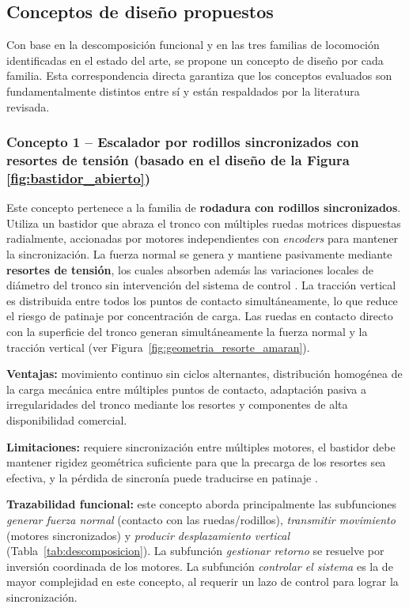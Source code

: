 \documentclass[lettersize,journal]{IEEEtran}
\begin{document}
\subsection{\textbf{Conceptos de diseño propuestos}}

Con base en la descomposición funcional y en las tres familias de locomoción
identificadas en el estado del arte, se propone un concepto de diseño por cada
familia. Esta correspondencia directa garantiza que los conceptos evaluados son
fundamentalmente distintos entre sí y están respaldados por la literatura revisada.

\subsubsection{Concepto 1 -- Escalador por rodillos sincronizados con resortes de
tensión (basado en el diseño de la Figura \ref{fig:bastidor_abierto})}

Este concepto pertenece a la familia de \textbf{rodadura con rodillos sincronizados}.
Utiliza un bastidor que abraza el tronco con múltiples ruedas motrices dispuestas
radialmente, accionadas por motores independientes con \emph{encoders} para mantener
la sincronización. La fuerza normal se genera y mantiene pasivamente mediante
\textbf{resortes de tensión}, los cuales absorben además las variaciones locales de
diámetro del tronco sin intervención del sistema de control
\cite{Amaran2021, GuiTangMukhopadhyay2018}. La tracción vertical es distribuida entre
todos los puntos de contacto simultáneamente, lo que reduce el riesgo de patinaje
por concentración de carga. Las ruedas en contacto directo con la superficie del tronco
generan simultáneamente la fuerza normal y la tracción vertical
(ver Figura~\ref{fig:geometria_resorte_amaran}).

\textbf{Ventajas:} movimiento continuo sin ciclos alternantes, distribución homogénea
de la carga mecánica entre múltiples puntos de contacto, adaptación pasiva a
irregularidades del tronco mediante los resortes y componentes de alta disponibilidad
comercial.

\textbf{Limitaciones:} requiere sincronización entre múltiples motores, el bastidor
debe mantener rigidez geométrica suficiente para que la precarga de los resortes sea
efectiva, y la pérdida de sincronía puede traducirse en patinaje
\cite{GuiTangMukhopadhyay2018}.

\textbf{Trazabilidad funcional:} este concepto aborda principalmente las subfunciones
\emph{generar fuerza normal} (contacto con las ruedas/rodillos), \emph{transmitir movimiento}
(motores sincronizados) y \emph{producir desplazamiento vertical}
(Tabla~\ref{tab:descomposicion}). La subfunción \emph{gestionar retorno} se resuelve
por inversión coordinada de los motores. La subfunción \emph{controlar el sistema}
es la de mayor complejidad en este concepto, al requerir un lazo de control para lograr la
sincronización.
\end{document}
